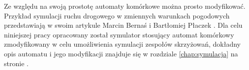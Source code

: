 Ze względu na swoją prostotę automaty komórkowe można prosto modyfikować. Przykład symulacji ruchu drogowego w zmiennych warunkach pogodowych przedstawiają w swoim artykule Marcin Bernaś i Bartłomiej Płaczek \cite{bernas+placzek}. Dla celu niniejszej pracy opracowany został symulator stosujący automat komórkowy zmodyfikowany w celu umożliwienia symulacji zespołów skrzyżowań, dokładny opis automatu i jego modyfikacji znajduje się w rozdziale \ref{chap:symulacja} na stronie \pageref{chap:symulacja}.